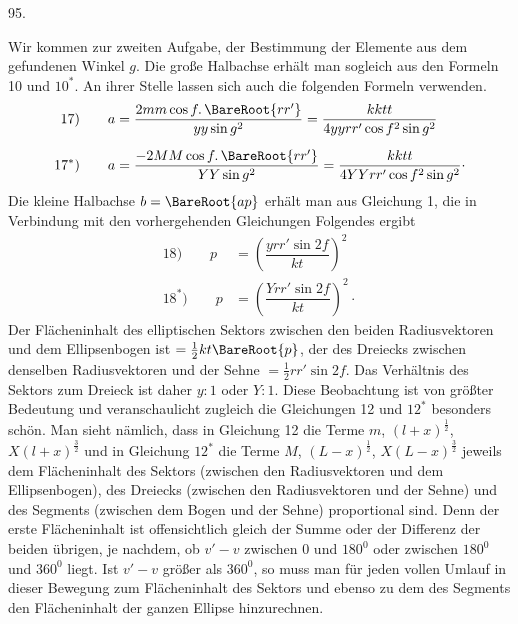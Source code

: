 \par{}\medskip
\hypertarget{native-128-article095}{}
\begin{center}95.\end{center}
Wir kommen zur zweiten Aufgabe, der Bestimmung der Elemente aus dem gefundenen Winkel $g$. Die große Halbachse erhält man sogleich aus den Formeln 10 und $10^{\ast}$. An ihrer Stelle lassen sich auch die folgenden Formeln verwenden.
\[
\begin{aligned}
\mathrm{17)}\qquad a&=\dfrac{2mm\cos f\mathpunct{.}\BareRoot{rr'}}{yy\sin g^2}=\dfrac{kktt}{4yyrr'\cos f^2\sin g^2}\\[6pt]
\mathrm{17}^{\ast}\mathrm{)}\qquad a&=\dfrac{-2MM\cos f\mathpunct{.}\BareRoot{rr'}}{YY\sin g^2}=\dfrac{kktt}{4YYrr'\cos f^2\sin g^2}\mathpunct{\cdot}
\end{aligned}
\]
Die kleine Halbachse $b=\BareRoot{ap}$ erhält man aus Gleichung 1, die in Verbindung mit den vorhergehenden Gleichungen Folgendes ergibt
\[
\begin{aligned}
\mathrm{18)}\qquad p&=\left(\dfrac{yrr'\sin 2f}{kt}\right)^2\\[6pt]
\mathrm{18}^{\ast}\mathrm{)}\qquad p&=\left(\dfrac{Yrr'\sin 2f}{kt}\right)^2\mathpunct{\cdot}
\end{aligned}
\]
Der Flächeninhalt des elliptischen Sektors zwischen den beiden Radiusvektoren und dem Ellipsenbogen ist $=\frac12 kt\BareRoot{p}$, der des Dreiecks zwischen denselben Radiusvektoren und der Sehne $=\frac12 rr'\sin 2f$. Das Verhältnis des Sektors zum Dreieck ist daher $y:1$ oder $Y:1$. Diese Beobachtung ist von größter Bedeutung und veranschaulicht zugleich die Gleichungen 12 und $12^{\ast}$ besonders schön. Man sieht nämlich, dass in Gleichung 12 die Terme $m$, $(l+x)^{\frac12}$, $X(l+x)^{\frac32}$ und in Gleichung $12^{\ast}$ die Terme $M$, $(L-x)^{\frac12}$, $X(L-x)^{\frac32}$ jeweils dem Flächeninhalt des Sektors (zwischen den Radiusvektoren und dem Ellipsenbogen), des Dreiecks (zwischen den Radiusvektoren und der Sehne) und des Segments (zwischen dem Bogen und der Sehne) proportional sind. Denn der erste Flächeninhalt ist offensichtlich gleich der Summe oder der Differenz der beiden übrigen, je nachdem, ob $v'-v$ zwischen 0 und $180^0$ oder zwischen $180^0$ und $360^0$ liegt. Ist $v'-v$ größer als $360^0$, so muss man für jeden vollen Umlauf in dieser Bewegung zum Flächeninhalt des Sektors und ebenso zu dem des Segments den Flächeninhalt der ganzen Ellipse hinzurechnen.

